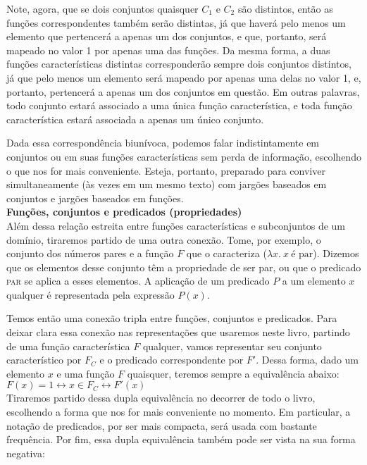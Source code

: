 \n Note, agora, que se dois conjuntos quaisquer $C_1$ e $C_2$ são distintos, então as funções correspondentes também serão distintas, já que haverá pelo menos um elemento que pertencerá a apenas um dos conjuntos, e que, portanto, será mapeado no valor 1 por apenas uma das funções. Da mesma forma, a duas funções características distintas corresponderão
sempre dois conjuntos distintos, já que pelo menos um elemento será mapeado por apenas uma delas no valor 1, e, portanto, pertencerá a apenas um dos conjuntos em questão. Em outras palavras, todo conjunto estará associado a uma única função característica, e toda função característica estará associada a apenas um único conjunto.

Dada essa correspondência biunívoca, podemos falar indistintamente em conjuntos ou em suas funções características sem perda de
informação, escolhendo o que nos for mais conveniente. Esteja,
portanto, preparado para conviver simultaneamente (às vezes em um
mesmo texto) com jargões baseados em conjuntos e jargões baseados em funções.\\

\n \textbf{Funções, conjuntos e predicados (propriedades) }\\

\n Além dessa relação estreita entre funções características e subconjuntos de um domínio, tiraremos partido de uma outra conexão. Tome, por exemplo, o conjunto dos números pares e a função $F$ que o caracteriza ($\lambda x.\ x\ \text{é par}$). Dizemos que os elementos desse conjunto têm a propriedade de ser par, ou que o predicado \textsc{par} se aplica a esses elementos. A aplicação de um predicado $P$ a um elemento $x$ qualquer é representada pela expressão $P(x)$.

Temos então uma conexão tripla entre funções, conjuntos e predicados. Para deixar clara essa conexão nas representações que usaremos neste livro, partindo de uma função característica $F$ qualquer, vamos representar seu conjunto característico por $F_C$ e o predicado correspondente por $F'$. Dessa forma, dado um elemento $x$ e uma função $F$ quaisquer, teremos sempre a equivalência abaixo:\\

\n $F(x)=1 \leftrightarrow x \in F_C \leftrightarrow F'(x)$\\

\n Tiraremos partido dessa dupla equivalência no decorrer de todo o livro, escolhendo a forma que nos for mais conveniente no momento. Em particular, a notação de predicados, por ser mais compacta, será usada com bastante frequência. Por fim, essa dupla equivalência também pode ser vista na sua forma negativa:\\

